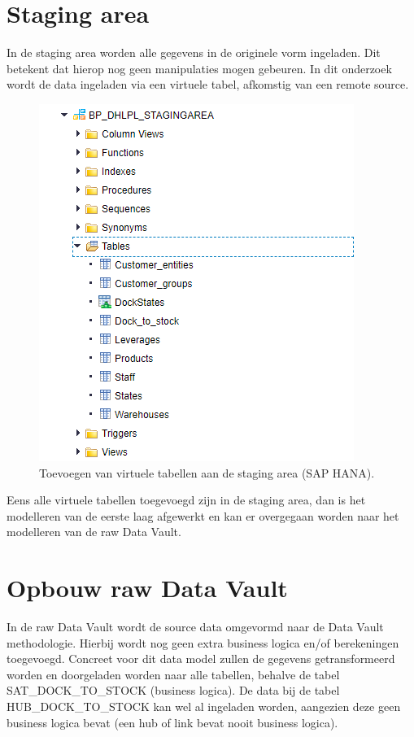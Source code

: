 \section{Staging area}
\label{sec:stagareadv}
In de staging area worden alle gegevens in de originele vorm ingeladen. Dit betekent dat hierop nog geen manipulaties mogen gebeuren. In dit onderzoek wordt de data ingeladen via een virtuele tabel, afkomstig van een remote source.

\begin{figure}[h]
	\centering
	\includegraphics[scale=0.45]{../images/DV_staging.png}
	\caption{Toevoegen van virtuele tabellen aan de staging area (SAP HANA).}
	\label{fig:dpa}
\end{figure}

Eens alle virtuele tabellen toegevoegd zijn in de staging area, dan is het modelleren van de eerste laag afgewerkt en kan er overgegaan worden naar het modelleren van de raw Data Vault.

\section{Opbouw raw Data Vault}
In de raw Data Vault wordt de source data omgevormd naar de Data Vault methodologie. Hierbij wordt nog geen extra business logica en/of berekeningen toegevoegd. Concreet voor dit data model zullen de gegevens getransformeerd worden en doorgeladen worden naar alle tabellen, behalve de tabel SAT\_DOCK\_TO\_STOCK (business logica). De data bij de tabel HUB\_DOCK\_TO\_STOCK kan wel al ingeladen worden, aangezien deze geen business logica bevat (een hub of link bevat nooit business logica).

